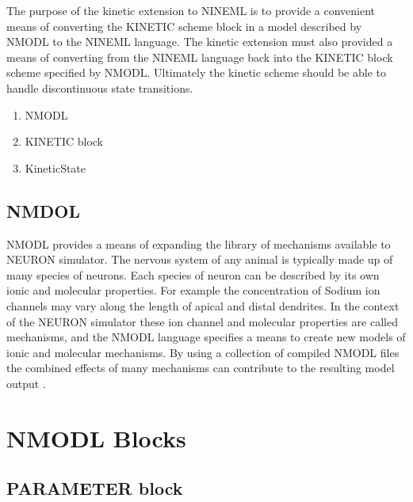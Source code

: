 \documentclass[draftspec]{ninemlspec}
\begin{document}
The purpose of the kinetic extension to NINEML is to provide a convenient means of converting the KINETIC scheme block in a model described by NMODL to the NINEML language. The kinetic extension must also provided a means of converting from the NINEML language back into the KINETIC block scheme specified by NMODL. Ultimately the kinetic scheme should be able to handle discontinuous state transitions.

\begin{enumerate}
\item NMODL
\item KINETIC block
\item KineticState
\end{enumerate}




\subsection{NMDOL}
NMODL provides a means of expanding the library of mechanisms available to NEURON simulator. The nervous system of any animal is typically made up of many species of neurons. Each species of neuron can be described by its own ionic and molecular properties. For example the concentration of Sodium ion channels may vary along the length of apical and distal dendrites. In the context of the NEURON simulator these ion channel and molecular properties are called mechanisms, and the NMODL language specifies a means to create new models of ionic and molecular mechanisms. By using a collection of compiled NMODL files the combined effects of many mechanisms can contribute to the resulting model output \cite{carnevale2006neuron}. 

\section{NMODL Blocks}

\subsection{PARAMETER block}
\end{document}
